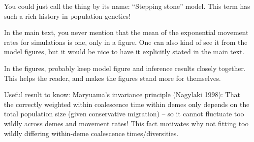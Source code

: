
\begin{point}{}
    You could just call the thing by its name: ``Stepping stone'' model. This
    term has such a rich history in population genetics!
\end{point}


\begin{point}{}
    In the main text, you never mention that the mean of the exponential
    movement rates for simulations is one, only in a figure. One can also kind
    of see it from the model figures, but it would be nice to have it
    explicitly stated in the main text.
\end{point}


\begin{point}{}
    In the figures, probably keep model figure and inference results closely
    together. This helps the reader, and makes the figures stand more for
    themselves.
\end{point}


\begin{point}{}
    Useful result to know: Maryuama’s invariance principle (Nagylaki 1998):
    That the correctly weighted within coalescence time within demes only
    depends on the total population size  (given conservative migration) -- so
    it cannot fluctuate too wildly across demes and movement rates! This fact
    motivates why not fitting too wildly differing within-deme coalescence
    times/diversities.
\end{point}


